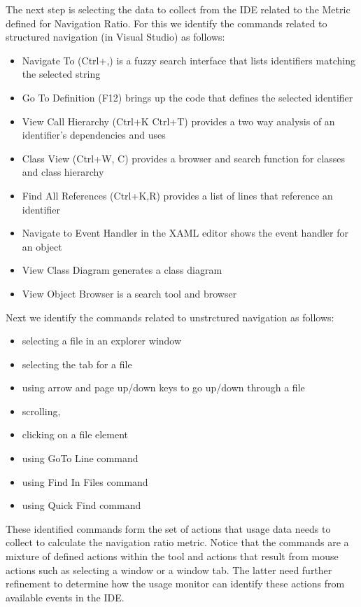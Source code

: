 The next step is selecting the data to collect from the IDE related to the Metric defined for Navigation Ratio.  For this we identify the  commands related to structured navigation (in Visual Studio) as follows:
\begin{itemize}
\item
 Navigate To (Ctrl+,) is a fuzzy search interface that lists identifiers matching the selected string
\item Go To Definition (F12) brings up the code that defines the selected identifier
\item View Call Hierarchy (Ctrl+K Ctrl+T) provides a two way analysis of an identifier's dependencies and uses
\item Class View (Ctrl+W, C) provides a browser and search function for classes and class hierarchy
\item Find All References (Ctrl+K,R) provides a list of lines that reference an identifier
\item Navigate to Event Handler in the XAML editor shows the event handler for an object
\item View Class Diagram generates a class diagram
\item View Object Browser is a search tool and browser
\end{itemize}

Next we identify the commands related to unstrctured navigation as follows:
\begin{itemize}
\item selecting a file in an explorer window
\item selecting the tab for a file
\item using arrow and page up/down keys to go up/down through a file
\item scrolling,
\item clicking on a file element
\item using GoTo Line command
\item using Find In Files command
\item using Quick Find command
\end{itemize}

These identified commands form the set of actions that usage data needs to collect to calculate the navigation ratio metric.  Notice that the commands are a mixture of defined actions within the tool and actions that result from mouse actions such as selecting a window or a window tab.  The latter need further refinement to determine how the usage monitor can identify these actions from available events in the IDE. 

